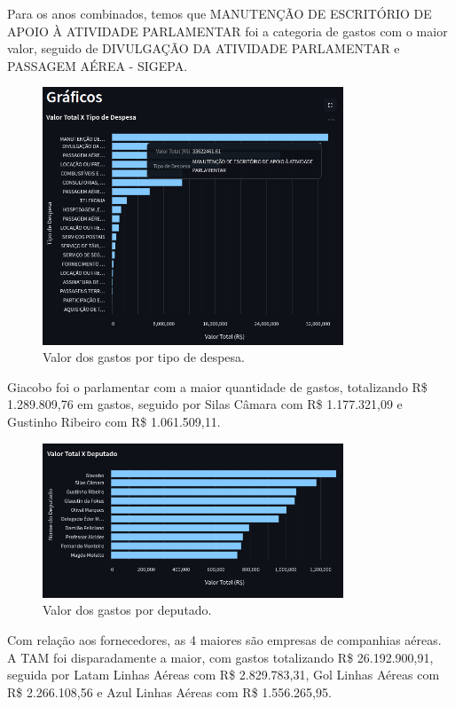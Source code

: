 \documentclass[12pt, a4paper]{article}
\begin{document}
Para os anos combinados, temos que MANUTENÇÃO DE ESCRITÓRIO DE APOIO À ATIVIDADE PARLAMENTAR foi a categoria de gastos com o maior valor, seguido de DIVULGAÇÃO DA ATIVIDADE PARLAMENTAR e PASSAGEM AÉREA - SIGEPA.

\begin{figure}[!htbp]
	\centering
	\includegraphics[width=0.8\textwidth]{assets/2_plot2.png}
	\caption{Valor dos gastos por tipo de despesa.}
	\label{fig:criacao_postgresql}
\end{figure}

Giacobo foi o parlamentar com a maior quantidade de gastos, totalizando R\$ 1.289.809,76 em gastos, seguido por Silas Câmara com R\$ 1.177.321,09 e Gustinho Ribeiro com R\$ 1.061.509,11.

\begin{figure}[!htbp]
	\centering
	\includegraphics[width=0.8\textwidth]{assets/2_plot3.png}
	\caption{Valor dos gastos por deputado.}
	\label{fig:criacao_postgresql}
\end{figure}

Com relação aos fornecedores, as 4 maiores são empresas de companhias aéreas. A TAM foi disparadamente a maior, com gastos totalizando R\$ 26.192.900,91, seguida por Latam Linhas Aéreas com R\$ 2.829.783,31, Gol Linhas Aéreas com R\$ 2.266.108,56 e Azul Linhas Aéreas com R\$ 1.556.265,95.
\end{document}
